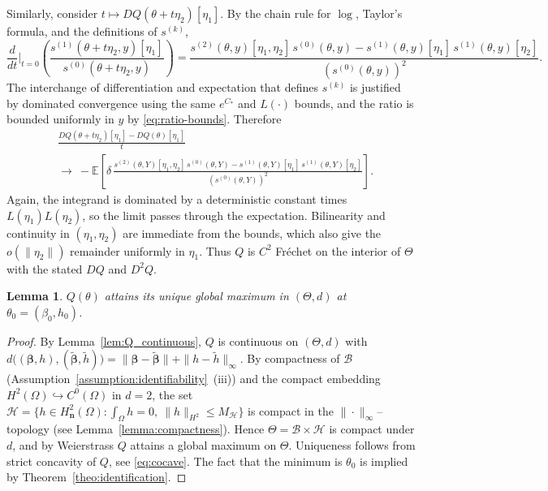 \documentclass[11pt]{article}
\newcommand{\E}{\mathbb{E}}
\newtheorem{lemma}{Lemma}
\begin{document}
    Similarly, consider $t\mapsto DQ(\theta+t\eta_2)[\eta_1]$.
    By the chain rule for $\log$, Taylor’s formula, and the definitions of $s^{(k)}$,
    \[
    \frac{d}{dt}\Big|_{t=0}\left(\frac{s^{(1)}(\theta+t\eta_2,y)[\eta_1]}{s^{(0)}(\theta+t\eta_2,y)}\right)
    =\frac{s^{(2)}(\theta,y)[\eta_1,\eta_2]\,s^{(0)}(\theta,y)
    -s^{(1)}(\theta,y)[\eta_1]\,s^{(1)}(\theta,y)[\eta_2]}{(s^{(0)}(\theta,y))^2}.
    \]
    The interchange of differentiation and expectation that defines $s^{(k)}$ is
    justified by dominated convergence using the same $e^{C_*}$ and $L(\cdot)$ bounds,
    and the ratio is bounded uniformly in $y$ by \eqref{eq:ratio-bounds}.
    Therefore
    \begin{align*}
    &\frac{DQ(\theta+t\eta_2)[\eta_1]-DQ(\theta)[\eta_1]}{t}\\
    &\longrightarrow\
    -\E\!\left[\delta\,
    \frac{s^{(2)}(\theta,Y)[\eta_1,\eta_2]\,s^{(0)}(\theta,Y)
    -s^{(1)}(\theta,Y)[\eta_1]\,s^{(1)}(\theta,Y)[\eta_2]}
    {(s^{(0)}(\theta,Y))^2}\right].
    \end{align*}
    Again, the integrand is dominated by a deterministic constant times
    $L(\eta_1)L(\eta_2)$, so the limit passes through the expectation.
    Bilinearity and continuity in $(\eta_1,\eta_2)$ are immediate from the bounds,
    which also give the $o(\|\eta_2\|)$ remainder uniformly in $\eta_1$.
    Thus $Q$ is $C^2$ Fr\'echet on the interior of $\Theta$ with the
    stated $DQ$ and $D^2Q$.

	
	
	\begin{lemma}\label{lem:uniq_max}
		$Q(\theta)$ attains its unique global maximum in $(\Theta,d)$  at
		$\theta_0=(\beta_0,h_0)$.
	\end{lemma}
	
    \begin{proof}
        By Lemma~\ref{lem:Q_continuous}, $Q$ is continuous on $(\Theta,d)$ with
    $d\big((\bm\beta,h),(\tilde{\bm\beta},\tilde h)\big)
    =\|\bm\beta-\tilde{\bm\beta}\|+\|h-\tilde h\|_\infty$.
    By compactness of $\mathcal B$ (Assumption~\ref{assumption:identifiability}~(iii))
    and the compact embedding $H^2(\Omega)\hookrightarrow C^0(\Omega)$ in $d=2$,
    the set $\mathcal H=\{h\in H^2_{\mathbf n}(\Omega): \int_\Omega h=0,\ \|h\|_{H^2}\le M_{\mathcal H}\}$
    is compact in the $\|\cdot\|_\infty$–topology (see Lemma~\ref{lemma:compactness}).
    Hence $\Theta=\mathcal B\times\mathcal H$ is compact under $d$, and by Weierstrass
    $Q$ attains a global maximum on $\Theta$. Uniqueness follows from strict concavity of $Q$, see \eqref{eq:cocave}. The fact that the minimum is $\theta_0$ is implied by Theorem~\ref{theo:identification}.
    \end{proof}
\end{document}

